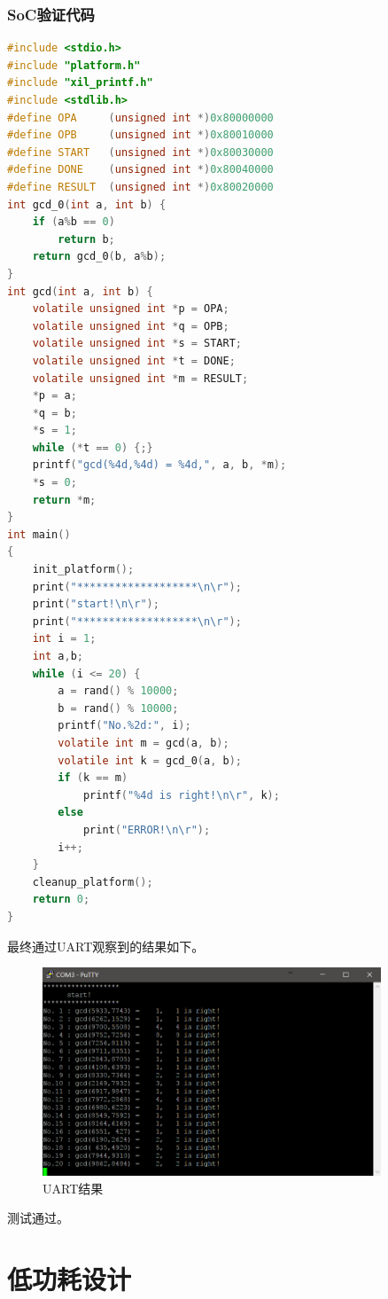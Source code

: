 \documentclass[12pt]{article}
\begin{document}
\subsubsection{SoC验证代码}
\lstset{language=C}
\begin{lstlisting}[language=c]
#include <stdio.h>
#include "platform.h"
#include "xil_printf.h"
#include <stdlib.h>
#define OPA 	(unsigned int *)0x80000000
#define OPB 	(unsigned int *)0x80010000
#define START 	(unsigned int *)0x80030000
#define DONE 	(unsigned int *)0x80040000
#define RESULT 	(unsigned int *)0x80020000
int gcd_0(int a, int b) {
	if (a%b == 0)
		return b;
	return gcd_0(b, a%b);
}
int gcd(int a, int b) {
	volatile unsigned int *p = OPA; 
	volatile unsigned int *q = OPB; 
	volatile unsigned int *s = START; 
	volatile unsigned int *t = DONE; 
	volatile unsigned int *m = RESULT; 
	*p = a;
	*q = b;
	*s = 1;
	while (*t == 0) {;}
	printf("gcd(%4d,%4d) = %4d,", a, b, *m);
	*s = 0;
	return *m;
}
int main()
{
	init_platform();
	print("*******************\n\r");
	print("start!\n\r");
	print("*******************\n\r");
	int i = 1;
	int a,b;
	while (i <= 20) {
		a = rand() % 10000;
		b = rand() % 10000;
		printf("No.%2d:", i);
		volatile int m = gcd(a, b);
		volatile int k = gcd_0(a, b);
		if (k == m)
			printf("%4d is right!\n\r", k);
		else
			print("ERROR!\n\r");
		i++;
	}
	cleanup_platform();
	return 0;
}
\end{lstlisting}
最终通过UART观察到的结果如下。
\begin{figure}[H]
\begin{center}
\includegraphics[width=0.9\textwidth]{./highperformance/Uart.png}
\caption{UART结果}
\label{Uart}
\end{center}
\end{figure}
测试通过。


\section{低功耗设计}
\end{document}
